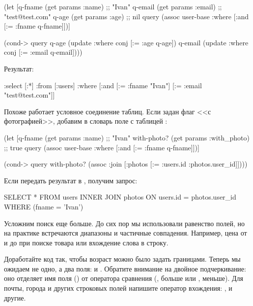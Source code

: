 \begin{english}
  \begin{clojure}
(let [q-fname (get params :name)  ;; "Ivan"
      q-email (get params :email) ;; "test@test.com"
      q-age   (get params :age)   ;; nil
      query
      (assoc user-base
             :where [:and [:= :fname q-fname]])]

  (cond-> query
    q-age
    (update :where conj [:= :age q-age])
    q-email
    (update :where conj [:= :email q-email])))
  \end{clojure}
\end{english}

Результат:

\begin{english}
  \begin{clojure}
{:select [:*]
 :from [:users]
 :where [:and
         [:= :fname "Ivan"]
         [:= :email "test@test.com"]]}
  \end{clojure}
\end{english}

Похоже работает условное соединение таблиц. Если задан флаг <<с фотографией>>, добавим в словарь поле  с таблицей :

\begin{english}
  \begin{clojure}
(let [q-fname (get params :name)           ;; "Ivan"
      with-photo? (get params :with_photo) ;; true
      query
      (assoc user-base
             :where [:and [:= :fname q-fname]])]

  (cond-> query
    with-photo?
    (assoc :join
           [:photos [:= :users.id :photos.user_id]])))
  \end{clojure}
\end{english}

Если передать результат в , получим запрос:

\begin{english}
  \begin{sql}
SELECT * FROM users
INNER JOIN photos ON users.id = photos.user_id
WHERE (fname = 'Ivan')
  \end{sql}
\end{english}

Усложним поиск еще больше. До сих пор мы использовали равенство полей, но на практике встречаются диапазоны и частичные совпадения. Например, цена от и до при поиске товара или вхождение слова в строку.

Доработайте код так, чтобы возраст можно было задать границами. Теперь мы ожидаем не одно, а два поля:  и . Обратите внимание на двойное подчеркивание: оно отделяет имя поля () от оператора сравнения (, больше или , меньше). Для почты, города и других строковых полей напишите оператор вхождения: ,  и другие.

